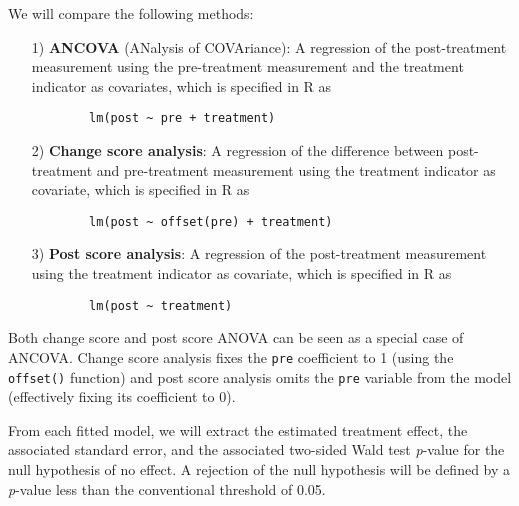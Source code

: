 \documentclass[12pt]{article}
\begin{document}
\begin{examplebox}
We will compare the following methods:
    \begin{itemize}
    \item[1)] \textbf{ANCOVA} (ANalysis of COVAriance): A regression of the post-treatment measurement using the pre-treatment measurement and the treatment indicator as covariates,
    which is specified in R as
    \begin{verbatim}
        lm(post ~ pre + treatment)
    \end{verbatim}

    \item[2)] \textbf{Change score analysis}: A regression of the difference between post-treatment and pre-treatment measurement using the treatment indicator as covariate,
    which is specified in R as
    \begin{verbatim}
        lm(post ~ offset(pre) + treatment)
    \end{verbatim}

    \item[3)] \textbf{Post score analysis}: A regression of the post-treatment measurement using the treatment indicator as covariate,
    which is specified in R as
    \begin{verbatim}
        lm(post ~ treatment)
    \end{verbatim}
\end{itemize}
Both change score and post score ANOVA can be seen as a special case of ANCOVA. Change score analysis fixes the \texttt{pre} coefficient to 1 (using the \texttt{offset()} function) and post score analysis omits the \texttt{pre} variable from the model (effectively fixing its coefficient to 0).

From each fitted model, we will extract the estimated treatment effect, the associated standard error, and the associated two-sided Wald test \textit{p}-value for the null hypothesis of no effect. A rejection of the null hypothesis will be defined by a \textit{p}-value less than the conventional threshold of 0.05.
\end{examplebox}
\end{document}
